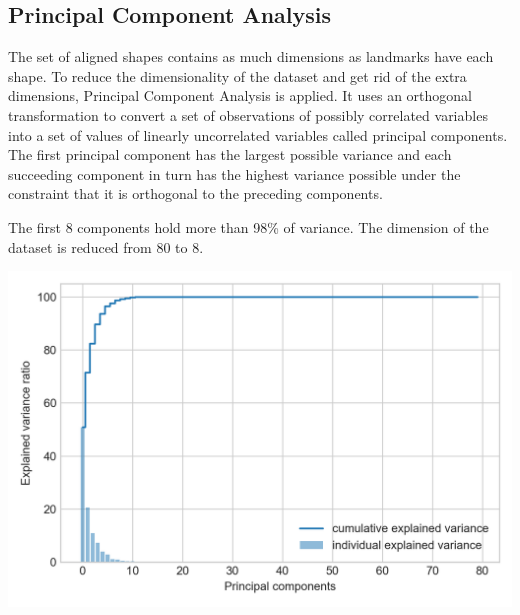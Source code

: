 

\subsection{Principal Component Analysis}
The set of aligned shapes contains as much dimensions as landmarks
have each shape. To reduce the dimensionality of the dataset and
get rid of the extra dimensions, Principal Component Analysis is
applied. It uses an orthogonal transformation to convert a set of
observations of possibly correlated variables into a set of values
of linearly uncorrelated variables called principal components.
The first principal component has the largest possible variance
and each succeeding component in turn has the highest variance
possible under the constraint that it is orthogonal to the
preceding components.

The first 8 components hold more than 98\% of variance. The
dimension of the dataset is reduced from 80 to 8.

\includegraphics[width=0.7\linewidth]{img/variance}
